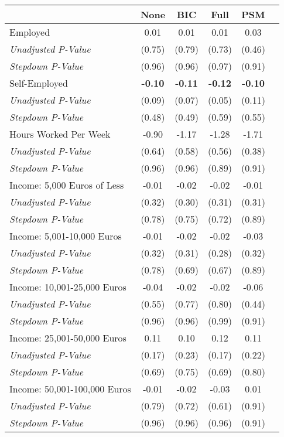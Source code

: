 \begin{tabular}{l c c c c c}
\toprule
 & None & BIC & Full & PSM \\
\midrule
Employed & 0.01 & 0.01 & 0.01 & 0.03 \\
\quad \textit{Unadjusted P-Value} & (0.75) & (0.79) & (0.73) & (0.46) \\
\quad \textit{Stepdown P-Value} & (0.96) & (0.96) & (0.97) & (0.91) \\
Self-Employed & \textbf{ -0.10 } & \textbf{ -0.11 } & \textbf{ -0.12 } & \textbf{ -0.10 } \\
\quad \textit{Unadjusted P-Value} & (0.09) & (0.07) & (0.05) & (0.11) \\
\quad \textit{Stepdown P-Value} & (0.48) & (0.49) & (0.59) & (0.55) \\
Hours Worked Per Week & -0.90 & -1.17 & -1.28 & -1.71 \\
\quad \textit{Unadjusted P-Value} & (0.64) & (0.58) & (0.56) & (0.38) \\
\quad \textit{Stepdown P-Value} & (0.96) & (0.96) & (0.89) & (0.91) \\
Income: 5,000 Euros of Less & -0.01 & -0.02 & -0.02 & -0.01 \\
\quad \textit{Unadjusted P-Value} & (0.32) & (0.30) & (0.31) & (0.31) \\
\quad \textit{Stepdown P-Value} & (0.78) & (0.75) & (0.72) & (0.89) \\
Income: 5,001-10,000 Euros & -0.01 & -0.02 & -0.02 & -0.03 \\
\quad \textit{Unadjusted P-Value} & (0.32) & (0.31) & (0.28) & (0.32) \\
\quad \textit{Stepdown P-Value} & (0.78) & (0.69) & (0.67) & (0.89) \\
Income: 10,001-25,000 Euros & -0.04 & -0.02 & -0.02 & -0.06 \\
\quad \textit{Unadjusted P-Value} & (0.55) & (0.77) & (0.80) & (0.44) \\
\quad \textit{Stepdown P-Value} & (0.96) & (0.96) & (0.99) & (0.91) \\
Income: 25,001-50,000 Euros & 0.11 & 0.10 & 0.12 & 0.11 \\
\quad \textit{Unadjusted P-Value} & (0.17) & (0.23) & (0.17) & (0.22) \\
\quad \textit{Stepdown P-Value} & (0.69) & (0.75) & (0.69) & (0.80) \\
Income: 50,001-100,000 Euros & -0.01 & -0.02 & -0.03 & 0.01 \\
\quad \textit{Unadjusted P-Value} & (0.79) & (0.72) & (0.61) & (0.91) \\
\quad \textit{Stepdown P-Value} & (0.96) & (0.96) & (0.96) & (0.91) \\
\bottomrule
\end{tabular}
